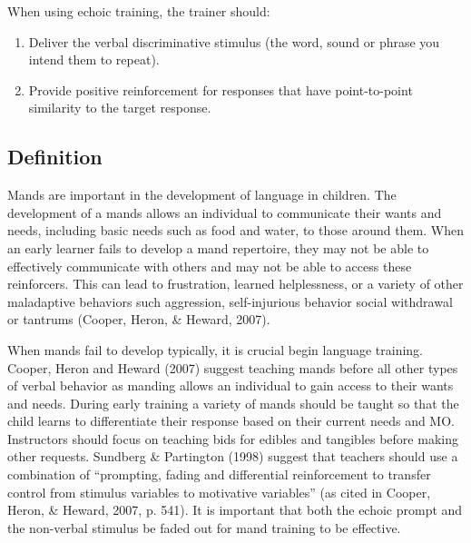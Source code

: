 When using echoic training, the trainer should:
\begin{enumerate}
\item Deliver the verbal discriminative stimulus (the word, sound or phrase you intend them to repeat).
\item Provide positive reinforcement for responses that have point-to-point similarity to the target response.  
\end{enumerate}
%
\subsection{Definition}
Mands are important in the development of language in children.  The development of a mands allows an individual to communicate their wants and needs, including basic needs such as food and water, to those around them.  When an early learner fails to develop a mand repertoire, they may not be able to effectively communicate with others and may not be able to access these reinforcers.  This can lead to frustration, learned helplessness, or a variety of other maladaptive behaviors such aggression, self-injurious behavior social withdrawal or tantrums (Cooper, Heron, \& Heward, 2007).

When mands fail to develop typically, it is crucial begin language training.   Cooper, Heron and Heward (2007) suggest teaching mands before all other types of verbal behavior as manding allows an individual to gain access to their wants and needs. During early training a variety of mands should be taught so that the child learns to differentiate their response based on their current needs and MO. Instructors should focus on teaching bids for edibles and tangibles before making other requests.   Sundberg \& Partington (1998) suggest that teachers should use a combination of ``prompting, fading and differential reinforcement to transfer control from stimulus variables to motivative variables'' (as cited in Cooper, Heron, \& Heward, 2007, p. 541).  It is important that both the echoic prompt and the non-verbal stimulus be faded out for mand training to be effective.  

